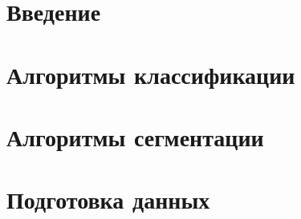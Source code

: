 \documentclass[14pt,a4paper]{extreport}
\begin{document}


\newpage
\chapter*{Введение}


\newpage
\chapter{Алгоритмы классификации}


\newpage
\chapter{Алгоритмы сегментации}


\newpage
\chapter{Подготовка данных}

\end{document}
